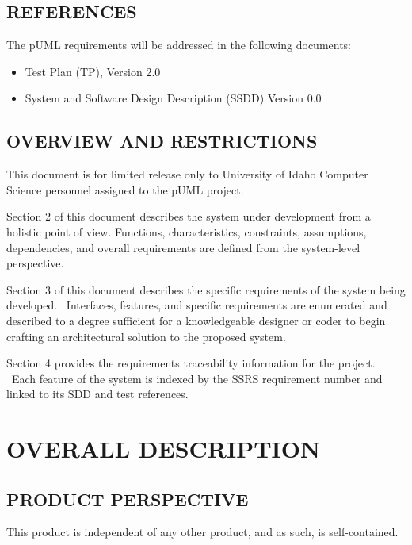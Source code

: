 \documentclass[twoside,letterpaper]{article}
\begin{document}
\subsection[REFERENCES]{\bfseries
REFERENCES}
{
The pUML requirements will be addressed in the following documents: 

\begin{itemize}
\item Test Plan (TP), Version 2.0
\item System and Software Design Description (SSDD) Version 0.0
\end{itemize}

}

\subsection[OVERVIEW AND RESTRICTIONS]{\bfseries
OVERVIEW AND RESTRICTIONS}
{
This document is for limited release only to University of Idaho Computer Science personnel assigned to the pUML project.
}


\bigskip

{
Section 2 of this document describes the system under development from a holistic point of view. 
\newline Functions, characteristics, constraints, assumptions, dependencies, and overall requirements are defined from the system-level perspective.
}


\bigskip

{
Section 3 of this document describes the specific requirements of the
system being developed. \ Interfaces, features, and specific
requirements are enumerated and described to a degree sufficient for a
knowledgeable designer or coder to begin crafting an architectural
solution to the proposed system.}


\bigskip

{
Section 4 provides the requirements traceability information for the
project. \ Each feature of the system is indexed by the SSRS
requirement number and linked to its SDD and test references.}




\clearpage\section[OVERALL DESCRIPTION]{\bfseries
OVERALL DESCRIPTION}

\subsection[PRODUCT PERSPECTIVE]{\bfseries
PRODUCT PERSPECTIVE}
{
This product is independent of any other product, and as such, is self-contained.
}
\end{document}
